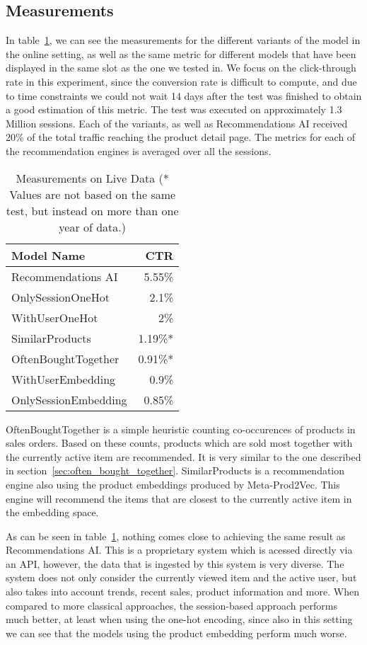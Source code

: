 \subsection{Measurements}
In table~\ref{tab:online_measurements}, we can see the measurements for the different variants of the model in the online setting, as well as the same metric for different models that have been displayed in the same slot as the one we tested in.
We focus on the click-through rate in this experiment, since the conversion rate is difficult to compute, and due to time constraints we could not wait 14 days after the test was finished to obtain a good estimation of this metric.
The test was executed on approximately 1.3 Million sessions. 
Each of the variants, as well as Recommendations AI received 20\% of the total traffic reaching the product detail page.
The metrics for each of the recommendation engines is averaged over all the sessions.
\begin{table}[t]
    \centering
    \begin{tabular}{lr}\toprule
        \textbf{Model Name} & \textbf{CTR} \\ \midrule
        Recommendations AI & 5.55\% \\
        OnlySessionOneHot & 2.1\% \\
        WithUserOneHot & 2\% \\
        SimilarProducts & 1.19\%* \\
        OftenBoughtTogether & 0.91\%* \\
        WithUserEmbedding & 0.9\% \\
        OnlySessionEmbedding & 0.85\% \\ \bottomrule
    \end{tabular}
    \caption{Measurements on Live Data (* Values are not based on the same test, but instead on more than one year of data.)}
    \label{tab:online_measurements}
\end{table}
\par
OftenBoughtTogether is a simple heuristic counting co-occurences of products in sales orders.
Based on these counts, products which are sold most together with the currently active item are recommended.
It is very similar to the one described in section~\ref{sec:often_bought_together}.
SimilarProducts is a recommendation engine also using the product embeddings produced by Meta-Prod2Vec.
This engine will recommend the items that are closest to the currently active item in the embedding space.
\par
As can be seen in table~\ref{tab:online_measurements}, nothing comes close to achieving the same result as Recommendations AI.
This is a proprietary system which is acessed directly via an API, however, the data that is ingested by this system is very diverse.
The system does not only consider the currently viewed item and the active user, but also takes into account trends, recent sales, product information and more.
When compared to more classical approaches, the session-based approach performs much better, at least when using the one-hot encoding, since also in this setting we can see that the models using the product embedding perform much worse.